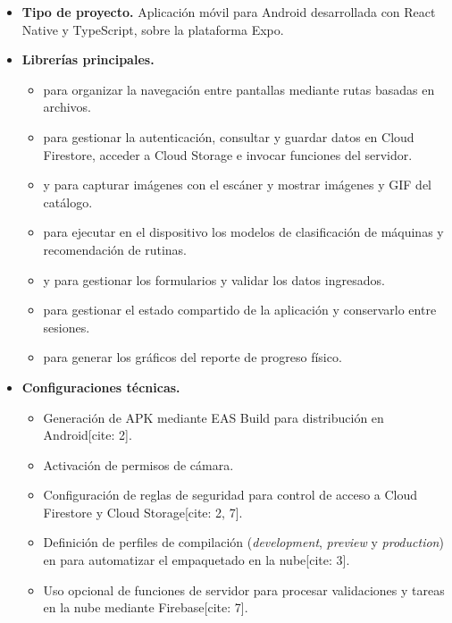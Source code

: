 \begin{itemize}
    \item \textbf{Tipo de proyecto.} Aplicación móvil para Android desarrollada
    con React Native y TypeScript, sobre la plataforma Expo.

    \item \textbf{Librerías principales.}
    \begin{itemize}
        \item {} para organizar la navegación entre pantallas
        mediante rutas basadas en archivos.
        \item {} para gestionar la autenticación, consultar y
        guardar datos en Cloud Firestore, acceder a Cloud Storage e invocar
        funciones del servidor.
        \item {} y  para capturar imágenes
        con el escáner y mostrar imágenes y GIF del catálogo.
        \item {} para ejecutar en el dispositivo
        los modelos de clasificación de máquinas y recomendación de rutinas.
        \item {} y  para gestionar los
        formularios y validar los datos ingresados.
        \item {} para gestionar el estado compartido de la
        aplicación y conservarlo entre sesiones.
        \item {} para generar los gráficos del
        reporte de progreso físico.
    \end{itemize}

    \item \textbf{Configuraciones técnicas.}
    \begin{itemize}
        \item Generación de APK mediante EAS Build para distribución en Android[cite: 2].
        \item Activación de permisos de cámara.
        \item Configuración de reglas de seguridad para control de acceso a Cloud Firestore y Cloud Storage[cite: 2, 7].
        \item Definición de perfiles de compilación (\emph{development}, \emph{preview} y \emph{production}) en  para automatizar el empaquetado en la nube[cite: 3].
        \item Uso opcional de funciones de servidor para procesar validaciones y tareas en la nube mediante Firebase[cite: 7].
    \end{itemize}
\end{itemize}


